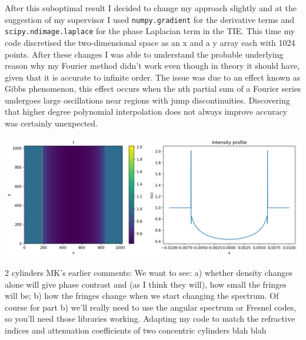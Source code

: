 \documentclass[9pt, a4paper]{article}
\newenvironment{Figure}
    {\par\medskip\noindent\minipage{\linewidth}}
    {\endminipage\par\medskip}
\begin{document}
After this suboptimal result I decided to change my approach slightly and at the suggestion of my supervisor I used \texttt{numpy.gradient} for the derivative terms and \texttt{scipy.ndimage.laplace} for the phase Laplacian term in the TIE. This time my code discretised the two-dimensional space as an x and a y array each with 1024 points. 
After these changes I was able to understand the probable underlying reason why my Fourier method didn't work even though in theory it should have, given that it is accurate to infinite order\cite{Chris}\cite{Fornberg}. The issue was due to an effect known as Gibbs phenomenon, this effect occurs when the nth partial sum of a Fourier series undergoes large oscillations near regions with jump discontinuities\cite{Gibbs}. Discovering that higher degree polynomial interpolation does not always improve accuracy was certainly unexpected.
\begin{Figure}
\centering
\includegraphics[width=\linewidth]{FD_intensity_profile.pdf}
\end{Figure}


2 cylinders
MK’s earlier comments:
We want to see:
a) whether density changes alone will give phase contrast and (as I think they will), how small the fringes will be;
b) how the fringes change when we start changing the spectrum. 
Of course for part b) we'll really need to use the angular spectrum or Fresnel codes, so you'll need those libraries working.
Adapting my code to match the refractive indices and attenuation coefficients of two concentric cylinders
 blah blah
\end{document}
